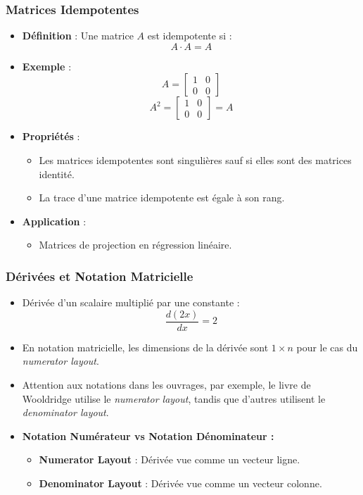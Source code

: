 \documentclass{beamer}
\begin{document}
\begin{frame}
  \frametitle{Matrices Idempotentes}
  \begin{itemize}
    \item \textbf{Définition} : Une matrice \(A\) est idempotente si :
    \[
    A \cdot A = A
    \]
    \item \textbf{Exemple} :
    \[
    A = \begin{bmatrix} 
    1 & 0 \\ 
    0 & 0 
    \end{bmatrix}
    \]
    \[
    A^2 = \begin{bmatrix} 
    1 & 0 \\ 
    0 & 0 
    \end{bmatrix} = A
    \]
    \item \textbf{Propriétés} :
      \begin{itemize}
        \item Les matrices idempotentes sont singulières sauf si elles sont des matrices identité.
        \item La trace d'une matrice idempotente est égale à son rang.
      \end{itemize}
    \item \textbf{Application} : 
      \begin{itemize}
        \item Matrices de projection en régression linéaire.
      \end{itemize}
  \end{itemize}
\end{frame}

\begin{frame}
  \frametitle{Dérivées et Notation Matricielle}
  \begin{itemize}
    \item Dérivée d’un scalaire multiplié par une constante :
    \[
    \frac{d(2x)}{dx} = 2
    \]
    \item En notation matricielle, les dimensions de la dérivée sont \(1 \times n\) pour le cas du \textit{numerator layout}.
    \item Attention aux notations dans les ouvrages, par exemple, le livre de Wooldridge utilise le \textit{numerator layout}, tandis que d'autres utilisent le \textit{denominator layout}.
    \item \textbf{Notation Numérateur vs Notation Dénominateur :}
      \begin{itemize}
        \item \textbf{Numerator Layout} : Dérivée vue comme un vecteur ligne.
        \item \textbf{Denominator Layout} : Dérivée vue comme un vecteur colonne.
      \end{itemize}
  \end{itemize}
\end{frame}
\end{document}
